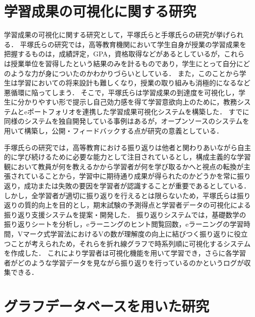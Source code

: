 \section{学習成果の可視化に関する研究}\label{sec:kasika_ref}
学習成果の可視化に関する研究として，平塚氏ら\cite{hira}と手塚氏ら\cite{teduka}の研究が挙げられる．
平塚氏らの研究では，高等教育機関において学生自身が授業の学習成果を把握するものは，成績評定，GPA，資格取得などがあるとしているが，これらは授業単位を習得したという結果のみを計るものであり，学生にとって自分にどのような力が身についたのかわかりづらいとしている．
また，このことから学生は学習においての将来設計も難しくなり，授業の取り組みも消極的になるなど悪循環に陥ってしまう．
そこで，平塚氏らは学習成果の到達度を可視化し，学生に分かりやすい形で提示し自己効力感を得て学習意欲向上のために，教務システムとeポートフォリオを連携した学習成果可視化システムを構築した．
すでに同様のシステムを独自開発している事例はあるが，オープンソースのシステムを用いて構築し，公開・フィードバックする点が研究の意義としている．

手塚氏らの研究では，高等教育における振り返りは他者と関わりあいながら自主的に学び続けるために必要な能力として注目されているとし，構成主義的な学習観において教員が何を教えるかから学習者が何を学び取るかへと視点の転換が主張されていることから，学習中に期待通り成果が得られたのかどうかを常に振り返り，成功または失敗の要因を学習者が認識することが重要であるとしている．
しかし，全学習者が適切に振り返りを行えるとは限らないため，平塚氏らは振り返りの質的向上を目的とし，期末試験の予測得点と学習者データの可視化による振り返り支援システムを提案・開発した．
振り返りシステムでは，基礎数学の振り返りシートを分析し，eラーニングのヒント閲覧回数，eラーニングの学習時間，Vマーク式学習法におけるVの数が理解度の向上に結びつく振り返りに役立つことが考えられため，それらを折れ線グラフで時系列順に可視化するシステムを作成した．
これにより学習者は可視化機能を用いて学習でき，さらに各学習者がどのような学習データを見ながら振り返りを行っているのかというログが収集できる．

\section{グラフデータベースを用いた研究}\label{sec:gra_ref}
